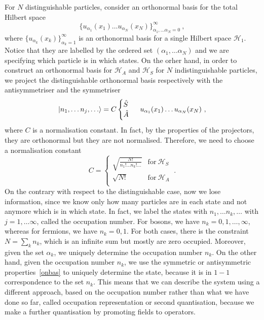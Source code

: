    For $N$ distinguishable particles, consider an orthonormal basis for the total Hilbert space
    \begin{equation*}
        \{u_{\alpha_1}(x_1) \ldots u_{\alpha_N}(x_N)\}_{\alpha_1, \ldots \alpha_N=0}^\infty ~,
    \end{equation*}
    where $\{u_{\alpha_k} (x_k)\}_{\alpha_k = 1}^\infty$ is an orthonormal basis for a single Hilbert space $\mathcal H_1$. Notice that they are labelled by the ordered set $(\alpha_1, \ldots \alpha_N)$ and we are specifying which particle is in which states. 
    On the orher hand, in order to construct an orthonormal basis for $\mathcal H_A$ and $\mathcal H_S$ for $N$ indistinguishable particles, we project the distinguishable orthonormal basis respectively with the antisymmetriser and the symmetriser
    \begin{equation}\label{onbas}
        \vert n_1, \ldots n_j, \ldots\rangle = C \begin{cases} \hat S \\ \hat A \end{cases} ~ u_{\alpha_1}(x_1) \ldots u_{\alpha_N}(x_N) ~,
    \end{equation}
    where $C$ is a normalisation constant. In fact, by the properties of the projectors, they are orthonormal but they are not normalised. Therefore, we need to choose a normalisation constant
    \begin{equation*}
        C = \begin{cases}
            \sqrt{\frac{N!}{n_1! \ldots n_k! \ldots}} & \text{for}~ \mathcal H_S \\
            \sqrt{N!} & \text{for}~ \mathcal H_A \\
        \end{cases} ~.
    \end{equation*}
    On the contrary with respect to the distinguishable case, now we lose information, since we know only how many particles are in each state and not anymore which is in which state. In fact, we label the states with $n_1, \ldots n_k, \dots$ with $j=1, \ldots \infty$, called the occupation number. For bosons, we have $n_k = 0, 1, \ldots, \infty$, whereas for fermions, we have $n_k = 0, 1$. For both cases, there is the constraint $N = \sum_k n_k$, which is an infinite sum but mostly are zero occupied. Moreover, given the set $\alpha_k$, we uniquely determine the occupation number $n_k$. On the other hand, given the occupation number $n_k$, we use the symmetric or antisymmetric properties~\eqref{onbas} to uniquely determine the state, because it is in $1-1$ correspondence to the set $n_k$. This means that we can describe the system using a different approach, based on the occupation number rather than what we have done so far, called occupation representation or second quantisation, because we make a further quantisation by promoting fields to operators.


